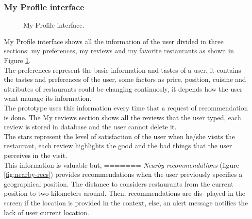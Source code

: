 \subsubsection{My Profile interface}

\begin{figure}
\captionsetup{font=footnotesize}
\centering
{}
\caption{My Profile interface.}
\label{fig:myprofile}   
\end{figure}
My Profile interface shows all the information of the user divided in
three sections: my preferences, my reviews and my favorite restaurants
as shown in Figure  \ref{fig:myprofile}. \\The preferences represent the basic
information and tastes of a user, it contains the tastes and preferences
of the user, some factors as price, position, cuisine and attributes
of restaurants could be changing continuosly, it depends how the user
want manage its information.\\ The prototype uses this information every
time that a request of recommendation is done.
The My reviews section shows all the reviews that the user typed, each
review is stored in database and the user cannot delete it. \\The stars
represent the level of satisfaction of the user when he/she visits the
restaurant, each review highlights the good and the bad things that
the user perceives in the visit. \\This information is valuable but,
=======
\textit{Nearby recommendations} (figure \ref{fig:nearby-recs}) 
provides recommendations when the
user previously specifies a geographical position. The distance to
considers restaurants from the current position to two kilometers
around. Then, recommendations are dis- played in the screen if the
location is provided in the context, else, an alert message  notifies
the lack of user current location.
